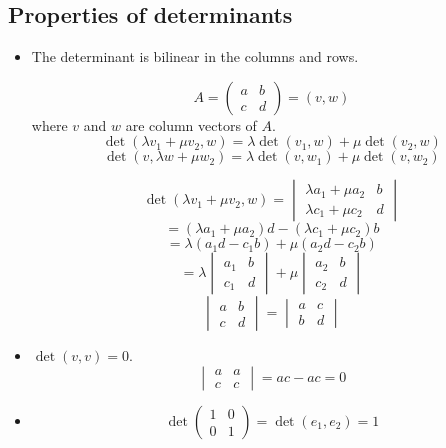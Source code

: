 \documentclass[a4paper,landscape,twocolumn]{article}
\begin{document}
\subsection{Properties of determinants}
%
\begin{itemize}
  \item The determinant is bilinear in the columns and rows.

    \[ A = \begin{pmatrix} a & b \\ c & d \end{pmatrix} = (v,w) \]
    where $v$ and $w$ are column vectors of $A$.
    \[ \det(\lambda v_1 + \mu v_2, w) = \lambda \det(v_1, w) + \mu \det(v_2, w) \]
    \[ \det(v, \lambda w + \mu w_2) = \lambda \det(v, w_1) + \mu \det(v, w_2) \]

    \[
      \det(\lambda v_1 + \mu v_2, w) =
      \begin{vmatrix}
        \lambda a_1 + \mu a_2 & b \\
        \lambda c_1 + \mu c_2 & d
      \end{vmatrix}
    \] \[
      = (\lambda a_1 + \mu a_2) d - (\lambda c_1 + \mu c_2) b
    \] \[
      = \lambda (a_1 d - c_1 b) + \mu (a_2 d - c_2 b)
    \] \[
      = \lambda \begin{vmatrix} a_1 & b \\ c_1 & d \end{vmatrix}
      + \mu \begin{vmatrix} a_2 & b \\ c_2 & d \end{vmatrix}
    \]
    \[ \begin{vmatrix} a & b \\ c & d \end{vmatrix} = \begin{vmatrix} a & c \\ b & d \end{vmatrix} \]
  \item
    $\det(v,v) = 0$.
    \[ \begin{vmatrix} a & a \\ c & c \end{vmatrix} = ac - ac = 0 \]
  \item
    \[ \det\begin{pmatrix} 1 & 0 \\ 0 & 1 \end{pmatrix} = \det(e_1, e_2) = 1 \]
\end{itemize}
\end{document}
